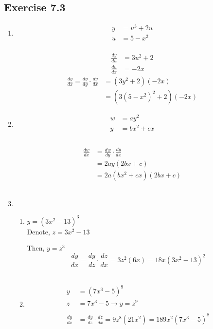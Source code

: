\documentclass{./../../Latex/homework}
\begin{document}
\subsection*{Exercise 7.3} 

\begin{enumerate}
\item 
$$
\begin{aligned}
y &=u^{3}+2 u \\
u &=5-x^{2} \\ 
\end{aligned} 
$$

$$
\begin{aligned}
\frac{d y}{d u} &=3 u^{2}+2 \\
\frac{d u}{d x} &=-2 x
\end{aligned}
$$
$$
\begin{aligned}
\frac{d y}{d x}=\frac{d y}{d y} \cdot \frac{d y}{d x} &=\left(3 y^{2}+2\right)(-2 x) \\
&=\left(3\left(5-x^{2}\right)^{2}+2\right)(-2 x)
\end{aligned}
$$
\item
$$
\begin{aligned}
w&=a y^{2} \\
y &=b x^{2}+c x \\
\end{aligned} 
$$ \\
$$
\begin{aligned}
\frac{d w}{d x} &=\frac{d w}{d y} \cdot \frac{d y}{d x} \\
&=2 a y(2 b x+c) \\
&=2 a\left(b x^{2}+c x\right)(2 b x+c)
\end{aligned}
$$ \\

\item \begin{enumerate}
\item $y=\left(3 x^{2}-13\right)^{3}$ \\

Denote, $z=3 x^{2}-13$

Then, $y=z^{3}$
$$
\frac{d y}{d x}=\frac{d y}{d z} \cdot \frac{d z}{d x}=3 z^{2}(6 x)=18 x\left(3 x^{2}-13\right)^{2}
$$ \\

\item
$$
\begin{aligned}
y &=\left(7 x^{3}-5\right)^{9} \\
z &=7 x^{3}-5 \rightarrow y=z^{9} \\~\\
\frac{d y}{d x} &=\frac{d y}{d z} \cdot \frac{d z}{d x}=9 z^{8}\left(21 x^{2}\right)=189 x^{2}\left(7 x^{3}-5\right)^{8}
\end{aligned}
$$\\


\end{enumerate}
\end{enumerate}
\end{document}
